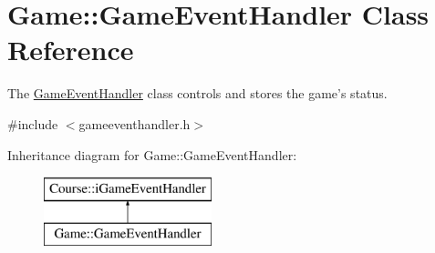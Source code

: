 \hypertarget{classGame_1_1GameEventHandler}{\section{Game\-:\-:Game\-Event\-Handler Class Reference}
\label{classGame_1_1GameEventHandler}
}


The \hyperlink{classGame_1_1GameEventHandler}{Game\-Event\-Handler} class controls and stores the game's status.  




{\ttfamily \#include $<$gameeventhandler.\-h$>$}

Inheritance diagram for Game\-:\-:Game\-Event\-Handler\-:\begin{figure}[H]
\begin{center}
\leavevmode
\includegraphics[height=2.000000cm]{classGame_1_1GameEventHandler}
\end{center}
\end{figure}

